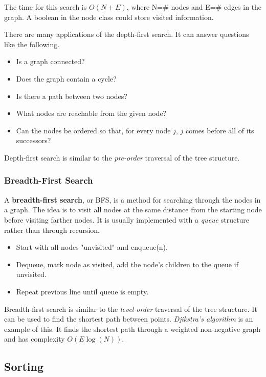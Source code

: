 The time for this search is $O(N+E)$, where N=\# nodes and E=\# edges in the graph. A boolean in the node class could store visited information.

There are many applications of the depth-first search. It can answer questions like the following.
\begin{itemize}
	\item Is a graph connected?
	\item Does the graph contain a cycle?
	\item Is there a path between two nodes?
	\item What nodes are reachable from the given node?
	\item Can the nodes be ordered so that, for every node $j$, $j$ comes before all of its successors?
\end{itemize}

Depth-first search is similar to the \textit{pre-order} traversal of the tree structure. 

\subsubsection{Breadth-First Search}

A \textbf{breadth-first search}, or BFS, is a method for searching through the nodes in a graph. The idea is to visit all nodes at the same distance from the starting node before visiting farther nodes. It is usually implemented with a \textit{queue} structure rather than through recursion. 

\begin{itemize}
	\item Start with all nodes "unvisited" and enqueue(n). 
	\item Dequeue, mark node as visited, add the node's children to the queue if unvisited. 
	\item Repeat previous line until queue is empty. 
\end{itemize}

Breadth-first search is similar to the \textit{level-order} traversal of the tree structure. It can be used to find the shortest path between points. \textit{Djikstra's algorithm} is an example of this. It finds the shortest path through a weighted non-negative graph and has complexity $O(E \log(N))$.

\subsection{Sorting}

